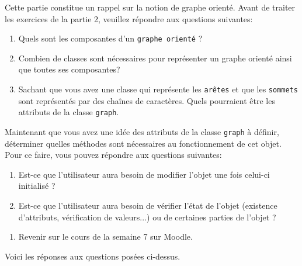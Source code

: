 
Cette partie constitue un rappel sur la notion de graphe orienté. Avant de traiter les exercices de la partie 2, veuillez répondre aux questions suivantes:
    \begin{enumerate}
        \item Quels sont les composantes d'un \lstinline{graphe orienté} ?
        \item Combien de classes sont nécessaires pour représenter un graphe orienté ainsi que toutes ses composantes?
        \item Sachant que vous avez une classe qui représente les \lstinline{arêtes} et que les \lstinline{sommets} sont représentés par des chaînes de caractères. Quels pourraient être les attributs de la classe \lstinline{graph}.
    \end{enumerate}

Maintenant que vous avez une idée des attributs de la classe \lstinline{graph} à définir, déterminer quelles méthodes sont nécessaires au fonctionnement de cet objet. Pour ce faire, vous pouvez répondre aux questions suivantes:
    \begin{enumerate}
    \item Est-ce que l'utilisateur aura besoin de modifier l'objet une fois celui-ci initialisé ?
    \item Est-ce que l'utilisateur aura besoin de vérifier l'état de l'objet (existence d'attributs, vérification de valeurs...) ou de certaines parties de l'objet ?
    \end{enumerate}

\begin{conseil}
   \begin{enumerate}
   \item Revenir sur le cours de la semaine 7 sur Moodle.
   \end{enumerate}
\end{conseil}
    
Voici les réponses aux questions posées ci-dessus. 

